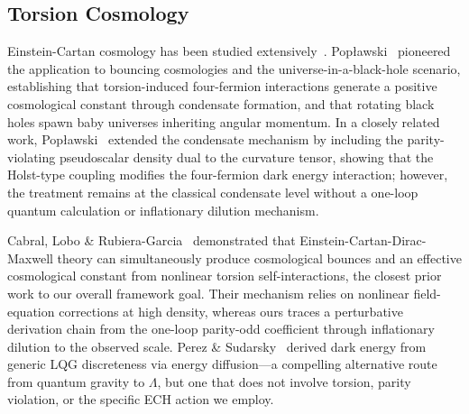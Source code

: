 \documentclass[aps,prd,twocolumn,superscriptaddress,showpacs,preprintnumbers,nofootinbib,longbibliography,floatfix]{revtex4-2}
\begin{document}
\subsection{Torsion Cosmology}

Einstein-Cartan cosmology has been studied extensively~\cite{Hehl1976}. Pop\l{}awski~\cite{Poplawski2012,Poplawski2016,Poplawski2019} pioneered the application to bouncing cosmologies and the universe-in-a-black-hole scenario, establishing that torsion-induced four-fermion interactions generate a positive cosmological constant through condensate formation, and that rotating black holes spawn baby universes inheriting angular momentum. In a closely related work, Pop\l{}awski~\cite{Poplawski2011} extended the condensate mechanism by including the parity-violating pseudoscalar density dual to the curvature tensor, showing that the Holst-type coupling modifies the four-fermion dark energy interaction; however, the treatment remains at the classical condensate level without a one-loop quantum calculation or inflationary dilution mechanism.

Cabral, Lobo \& Rubiera-Garcia~\cite{CabralLobo2020} demonstrated that Einstein-Cartan-Dirac-Maxwell theory can simultaneously produce cosmological bounces and an effective cosmological constant from nonlinear torsion self-interactions, the closest prior work to our overall framework goal. Their mechanism relies on nonlinear field-equation corrections at high density, whereas ours traces a perturbative derivation chain from the one-loop parity-odd coefficient through inflationary dilution to the observed scale. Perez \& Sudarsky~\cite{PerezSudarsky2019} derived dark energy from generic LQG discreteness via energy diffusion---a compelling alternative route from quantum gravity to $\Lambda$, but one that does not involve torsion, parity violation, or the specific ECH action we employ.
\end{document}
